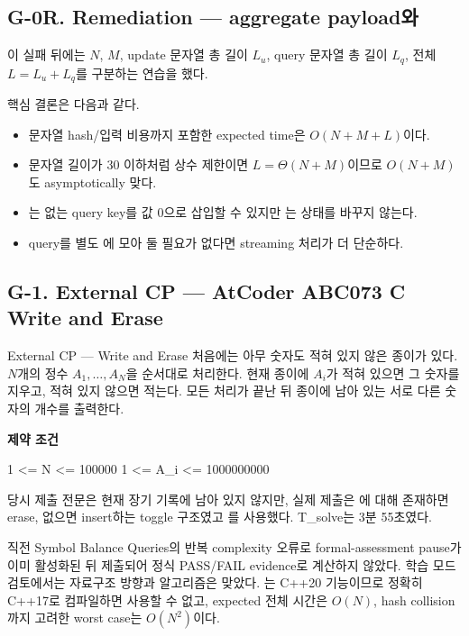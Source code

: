 \subsection{G-0R. Remediation --- aggregate payload와 }
이 실패 뒤에는 $N$, $M$, update 문자열 총 길이 $L_u$, query 문자열 총 길이 $L_q$, 전체 $L=L_u+L_q$를 구분하는 연습을 했다.

핵심 결론은 다음과 같다.
\begin{itemize}
\item 문자열 hash/입력 비용까지 포함한 expected time은 $O(N+M+L)$이다.
\item 문자열 길이가 30 이하처럼 상수 제한이면 $L=\Theta(N+M)$이므로 $O(N+M)$도 asymptotically 맞다.
\item {}는 없는 query key를 값 0으로 삽입할 수 있지만 는 상태를 바꾸지 않는다.
\item query를 별도 에 모아 둘 필요가 없다면 streaming 처리가 더 단순하다.
\end{itemize}

\subsection{G-1. External CP --- AtCoder ABC073 C Write and Erase}
\begin{problembox}{External CP --- Write and Erase}
처음에는 아무 숫자도 적혀 있지 않은 종이가 있다. $N$개의 정수 $A_1,\dots,A_N$을 순서대로 처리한다. 현재 종이에 $A_i$가 적혀 있으면 그 숫자를 지우고, 적혀 있지 않으면 적는다. 모든 처리가 끝난 뒤 종이에 남아 있는 서로 다른 숫자의 개수를 출력한다.

\textbf{제약 조건}
\begin{TextBlock}
1 <= N <= 100000
1 <= A_i <= 1000000000
\end{TextBlock}
\end{problembox}

\begin{notebox}[세션 복원 상태]
당시 제출 전문은 현재 장기 기록에 남아 있지 않지만, 실제 제출은 에 대해 존재하면 erase, 없으면 insert하는 toggle 구조였고 를 사용했다. T\_solve는 3분 55초였다.
\end{notebox}

\begin{notebox}[당시 판정 --- VOID]
직전 Symbol Balance Queries의 반복 complexity 오류로 formal-assessment pause가 이미 활성화된 뒤 제출되어 정식 PASS/FAIL evidence로 계산하지 않았다. 학습 모드 검토에서는 자료구조 방향과 알고리즘은 맞았다. 는 C++20 기능이므로 정확히 C++17로 컴파일하면 사용할 수 없고, expected 전체 시간은 $O(N)$, hash collision까지 고려한 worst case는 $O(N^2)$이다.
\end{notebox}

